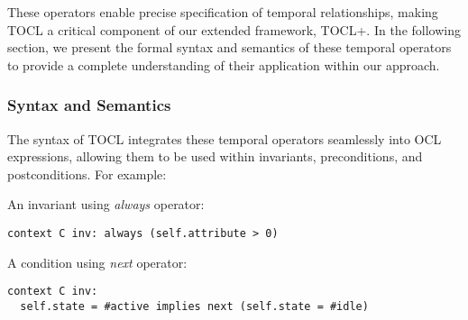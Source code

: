 These operators enable precise specification of temporal relationships, making TOCL 
a critical component of our extended framework, TOCL+. In the following section, we 
present the formal syntax and semantics of these temporal operators to provide a 
complete understanding of their application within our approach.






%
\subsubsection{Syntax and Semantics}
The syntax of TOCL integrates these temporal operators seamlessly into OCL expressions, allowing them to be used within invariants, preconditions, and postconditions. For example:

An invariant using \textit{always} operator:
\begin{lstlisting}[style=toclstyle]
context C inv: always (self.attribute > 0)
\end{lstlisting}

A condition using \textit{next} operator:
\begin{lstlisting}[style=toclstyle]
context C inv:
  self.state = #active implies next (self.state = #idle)
\end{lstlisting}


